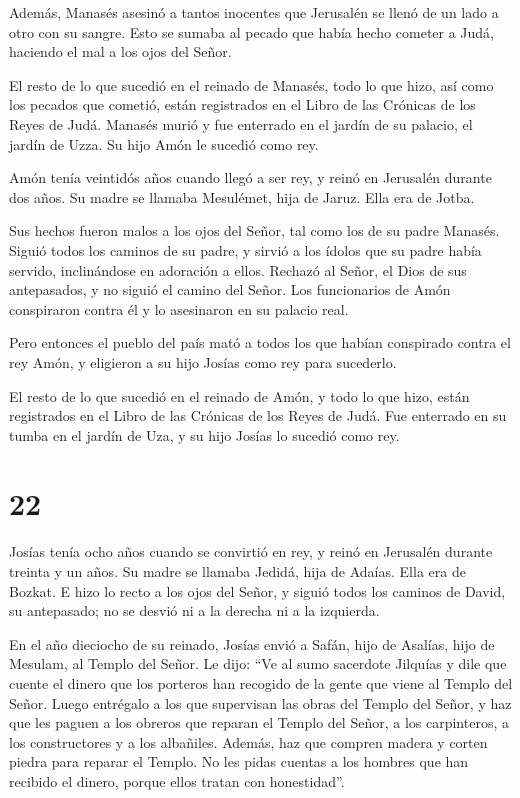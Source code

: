  Además, Manasés asesinó a tantos inocentes que Jerusalén
se llenó de un lado a otro con su sangre. Esto se sumaba al pecado que
había hecho cometer a Judá, haciendo el mal a los ojos del Señor.

 El resto de lo que sucedió en el reinado de Manasés, todo
lo que hizo, así como los pecados que cometió, están registrados en el
Libro de las Crónicas de los Reyes de Judá.  Manasés murió
y fue enterrado en el jardín de su palacio, el jardín de Uzza. Su hijo
Amón le sucedió como rey.

 Amón tenía veintidós años cuando llegó a ser rey, y reinó
en Jerusalén durante dos años. Su madre se llamaba Mesulémet, hija de
Jaruz. Ella era de Jotba.

 Sus hechos fueron malos a los ojos del Señor, tal como los
de su padre Manasés.  Siguió todos los caminos de su padre,
y sirvió a los ídolos que su padre había servido, inclinándose en
adoración a ellos.  Rechazó al Señor, el Dios de sus
antepasados, y no siguió el camino del Señor.  Los
funcionarios de Amón conspiraron contra él y lo asesinaron en su palacio
real.

 Pero entonces el pueblo del país mató a todos los que
habían conspirado contra el rey Amón, y eligieron a su hijo Josías como
rey para sucederlo.

 El resto de lo que sucedió en el reinado de Amón, y todo
lo que hizo, están registrados en el Libro de las Crónicas de los Reyes
de Judá.  Fue enterrado en su tumba en el jardín de Uza, y
su hijo Josías lo sucedió como rey.

\hypertarget{section-21}{%
\section{22}\label{section-21}}

 Josías tenía ocho años cuando se convirtió en rey, y reinó
en Jerusalén durante treinta y un años. Su madre se llamaba Jedidá, hija
de Adaías. Ella era de Bozkat.  E hizo lo recto a los ojos
del Señor, y siguió todos los caminos de David, su antepasado; no se
desvió ni a la derecha ni a la izquierda.

 En el año dieciocho de su reinado, Josías envió a Safán,
hijo de Asalías, hijo de Mesulam, al Templo del Señor. Le dijo:
 ``Ve al sumo sacerdote Jilquías y dile que cuente el dinero
que los porteros han recogido de la gente que viene al Templo del Señor.
 Luego entrégalo a los que supervisan las obras del Templo
del Señor, y haz que les paguen a los obreros que reparan el Templo del
Señor,  a los carpinteros, a los constructores y a los
albañiles. Además, haz que compren madera y corten piedra para reparar
el Templo.  No les pidas cuentas a los hombres que han
recibido el dinero, porque ellos tratan con honestidad''.

